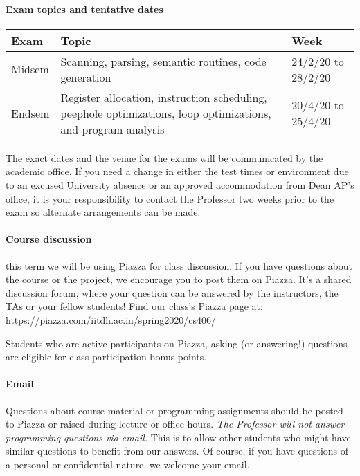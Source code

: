 \documentclass{article}
\begin{document}
\paragraph{Exam topics and tentative dates}
\begin{table}[H]
\centering
\begin{tabulary}{\linewidth}{|l|p{70mm}|p{40mm}|}\hline
Exam & Topic & Week \\ \hline
Midsem & Scanning, parsing, semantic routines, code generation &  24/2/20 to 28/2/20 \\ \hline
Endsem & Register allocation, instruction scheduling, peephole optimizations, loop optimizations, and program analysis & 20/4/20 to 25/4/20 \\
\hline
\end{tabulary}
\end{table}
The exact dates and the venue for the exams will be communicated by the academic office.
If you need a change in either the test times or environment due to an excused University absence or an approved accommodation from Dean AP's office, it is your responsibility to contact the Professor two weeks prior to the exam so alternate arrangements can be made. 

\paragraph{Course discussion} this term we will be using Piazza for class discussion. If you have questions about the course or the project, we encourage you to post them on Piazza. It's a shared discussion forum, where your question can be answered by the instructors, the TAs or your fellow students! Find our class's Piazza page at: https://piazza.com/iitdh.ac.in/spring2020/cs406/

Students who are active participants on Piazza, asking (or answering!) questions are eligible for class participation bonus points.

\paragraph{Email} Questions about course material or programming assignments should be posted to Piazza or raised during lecture or office hours. {\em The Professor will not answer programming questions via email.} This is to allow other students who might have similar questions to benefit from our answers. Of course, if you have questions of a personal or confidential nature, we welcome your email.
\end{document}
